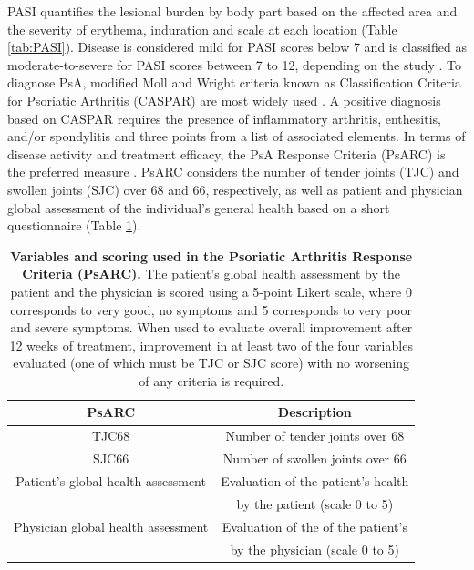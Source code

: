 PASI quantifies the lesional burden by body part based on the affected area and the severity of erythema, induration and scale at each location (Table \ref{tab:PASI}). Disease is considered mild for PASI scores below 7 and is classified as moderate-to-severe for PASI scores between 7 to 12, depending on the study \parencite{Finlay2005, Schmitt2005,Langewouters2008}. To diagnose PsA, modified Moll and Wright criteria known as Classification Criteria for Psoriatic Arthritis (CASPAR) are most widely used \parencite {Taylor2006}. A positive diagnosis based on CASPAR requires the presence of inflammatory arthritis, enthesitis, and/or spondylitis and three points from a list of associated elements. In terms of disease activity and treatment efficacy, the PsA Response Criteria (PsARC) is the preferred measure \parencite{Mease2011,Clegg1996}. PsARC considers the number of tender joints (TJC) and swollen joints (SJC) over 68 and 66, respectively, as well as patient and physician global assessment of the individual's general health based on a short questionnaire (Table \ref{tab:PsARC}). 


\begin{table}[htbp]
\centering
\setlength{\tabcolsep}{20pt}
\renewcommand{\arraystretch}{0.8}
\begin{tabular}{@{} c c}
\toprule
\textbf{PsARC} & \textbf{Description} \\
\midrule
\midrule
TJC68  & Number of tender joints over 68\\
SJC66  & Number of swollen joints over 66 \\
Patient’s global health assessment  & Evaluation of the patient's health\\
                                    & by the patient (scale 0 to 5)\\
Physician global health assessment  & Evaluation of the of the patient's \\
                                    & by the physician (scale 0 to 5) \\
\bottomrule
\end{tabular}
\medskip %
\caption[Variables and scoring used in the Psoriatic Arthritis Response Criteria (PsARC)]{\textbf{Variables and scoring used in the Psoriatic Arthritis Response Criteria (PsARC).} The patient's global health assessment by the patient and the physician is scored using a 5-point Likert scale, where 0 corresponds to very good, no symptoms and 5 corresponds to very poor and severe symptoms. When used to evaluate overall improvement after 12 weeks of treatment, improvement in at least two of the four variables evaluated (one of which must be TJC or SJC score) with no worsening of any criteria is required.}
\label{tab:PsARC}
\end{table}
\smallskip %



